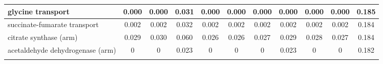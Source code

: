 \begin{longtable}{|l|c|c|c|c|c|c|c|c|c|c|}
glycine transport                                          & 0.000     & 0.000     & 0.031    & 0.000             & 0.000 & 0.000  & 0.000         & 0.000  & 0.000    & 0.185 \\ \hline
succinate-fumarate transport                               & 0.002     & 0.002     & 0.032    & 0.002             & 0.002 & 0.002  & 0.002         & 0.002  & 0.002    & 0.184 \\ \hline
citrate synthase (arm)                                     & 0.029     & 0.030     & 0.060    & 0.026             & 0.026 & 0.027  & 0.029         & 0.028  & 0.027    & 0.184 \\ \hline
acetaldehyde dehydrogenase (arm)                           & 0         & 0         & 0.023    & 0                 & 0     & 0      & 0.023         & 0      & 0        & 0.182 \\ \hline

\label{table:heatmap}
\end{longtable}
